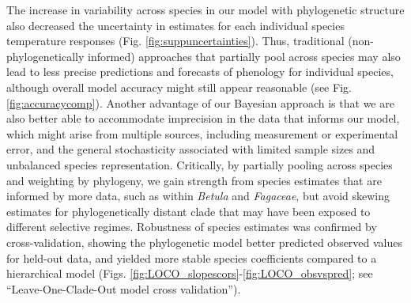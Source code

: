 \documentclass[11pt]{article}
\begin{document}
The increase in variability across species in our model with phylogenetic structure also decreased the uncertainty in estimates for each individual species temperature responses (Fig. \ref{fig:suppuncertainties}). Thus, traditional (non-phylogenetically informed) approaches that partially pool across species  \cite[most hierarchical models in ecology, e.g.,][]{flynn2018,ettinger2020} may also lead to less precise predictions and forecasts of phenology for individual species, although overall model accuracy might still appear reasonable (see Fig. \ref{fig:accuracycomp}). Another advantage of our Bayesian approach is that we are also better able to accommodate imprecision in the data that informs our model, which might arise from multiple sources, including measurement or experimental error, and the general stochasticity associated with limited sample sizes and unbalanced species representation. Critically, by partially pooling across species and weighting by phylogeny, we gain strength from species estimates that are informed by more data, such as within \emph{Betula} and \emph{Fagaceae}, but avoid skewing estimates for phylogenetically distant clade that may have been exposed to different selective regimes. Robustness of species estimates was confirmed by cross-validation, showing the phylogenetic model better predicted observed values for held-out data, and yielded more stable species coefficients compared to a hierarchical model (Figs. \ref{fig:LOCO_slopescors}-\ref{fig:LOCO_obsvspred}; see ``Leave-One-Clade-Out model cross validation''). %


\end{document}
